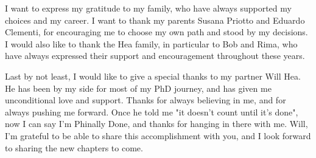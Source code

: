{I want to express my gratitude to my family, who have always supported my choices and my career. I want 
to thank my parents Susana Priotto and Eduardo Clementi, for encouraging me to choose my own path and 
stood by my decisions. I would also like to thank the Hea family, in particular to Bob and Rima, who 
have always expressed their support and encouragement throughout these years. 

Last by not least, I would like to give a special thanks to my partner Will Hea. He has been by my side
for most of my PhD journey, and has given me unconditional love and support. Thanks for always believing 
in me, and for always pushing me forward. Once he told me "it doesn't count until it's done", now I can 
say I'm Phinally Done, and thanks for hanging in there with me. Will, I'm grateful to be able to share 
this accomplishment with you, and I look forward to sharing the new chapters to come.     
}






\showcopyright
\showabstract
\showcommitteepage
\showdedication
\showacknowledgments
\hidepreface
\hideprologue
\hideforeword

